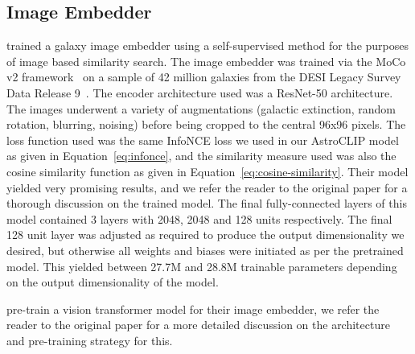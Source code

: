 \subsection{Image Embedder}\label{subsec:image-embedder}
\cite{stein2021} trained a galaxy image embedder using a self-supervised method for the purposes of image based similarity search.
The image embedder was trained via the MoCo v2 framework~\citep{moco2020, mocov22020} on a sample of 42 million galaxies
from the DESI Legacy Survey Data Release 9~\citep{desilegacy2018}.
The encoder architecture used was a ResNet-50 architecture.
The images underwent a variety of augmentations (galactic extinction, random rotation, blurring, noising) before
being cropped to the central 96x96 pixels.
The loss function used was the same InfoNCE loss we used in our AstroCLIP model as given in Equation~\eqref{eq:infonce},
and the similarity measure used was also the cosine similarity function as given in Equation~\eqref{eq:cosine-similarity}.
Their model yielded very promising results, and we refer the reader to the original paper for a thorough discussion
on the trained model.
The final fully-connected layers of this model contained 3 layers with 2048, 2048 and 128 units respectively.
The final 128 unit layer was adjusted as required to produce the output dimensionality we desired, but otherwise all
weights and biases were initiated as per the pretrained model.
This yielded between 27.7M and 28.8M trainable parameters depending on the output dimensionality of the model.

\cite{astroclip} pre-train a vision transformer model for their image embedder, we refer the reader to the original paper
for a more detailed discussion on the architecture and pre-training strategy for this.

